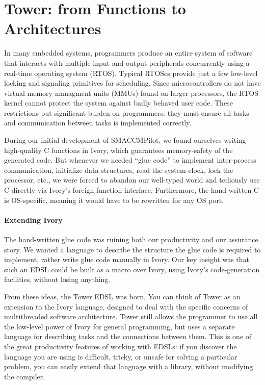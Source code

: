 \section{Tower: from Functions to Architectures}
\label{sec:tower}


In many embedded systems, programmers produce an entire system of software
that interacts with multiple input and output peripherals concurrently using a
real-time operating system (RTOS). Typical RTOSes provide just a few low-level
locking and signaling primitives for scheduling. Since microcontrollers do not
have virtual memory managment units (MMUs) found on larger processors, the RTOS
kernel cannot protect the system against badly behaved user code. These
restrictions put significant burden on programmers: they must ensure all tasks
and communication between tasks is implemented correctly.

During our initial development of SMACCMPilot, we found ourselves writing
high-quality C functions in Ivory, which guarantees memory-safety of the
generated code. But whenever we needed
``glue code'' to implement inter-process communication, initialize
data-structures, read the system clock, lock the processor, etc., we were forced
to abandon our well-typed world and tediously use C directly via Ivory's foreign
function interface.  Furthermore, the hand-written C is OS-specific, meaning it
would have to be rewritten for any OS port.

\paragraph{Extending Ivory}
The hand-written glue code was ruining both our productivity and our assurance
story. We wanted a language to describe the structure the glue code
is required to implement, rather write glue code manually in Ivory.
Our key insight was that such an EDSL could be built as a macro over Ivory,
using Ivory's code-generation facilities, without losing anything.

From these ideas, the Tower EDSL was born. You can think of Tower as an
extension to the Ivory language, designed to deal with the specific concerns of
multithreaded software architecture. Tower still allows the programmer to use
all the low-level power of Ivory for general programming, but uses a separate
language for describing tasks and the connections between them.  This is one of
the great productivity features of working with EDSLs: if you discover the
language you are using is difficult, tricky, or unsafe for solving a particular
problem, you can easily extend that language with a library, without modifying
the compiler.

